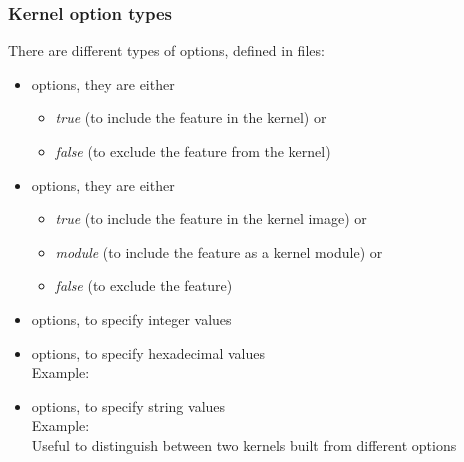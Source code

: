 \begin{frame}
  \frametitle{Kernel option types}
  There are different types of options, defined in  files:
  \begin{itemize}
  \item {} options, they are either
    \begin{itemize}
    \item {\em true} (to include the feature in the kernel) or
    \item {\em false} (to exclude the feature from the kernel)
    \end{itemize}
  \item {} options, they are either
    \begin{itemize}
    \item {\em true} (to include the feature in the kernel image) or
    \item {\em module} (to include the feature as a kernel module) or
    \item {\em false} (to exclude the feature)
    \end{itemize}
  \item {} options, to specify integer values
  \item {} options, to specify hexadecimal values\\
    Example: 
  \item {} options, to specify string values\\
    Example: \\
    Useful to distinguish between two kernels built from different options
  \end{itemize}
\end{frame}

